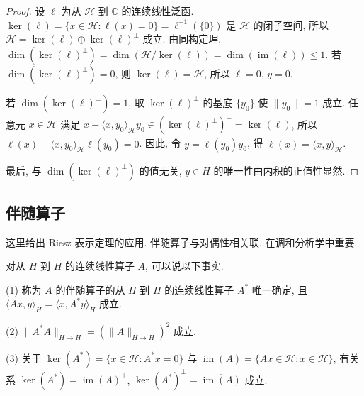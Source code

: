 \begin{proof}
设 $\ell$ 为从 $\mathcal{H}$ 到 $\mathbb{C}$ 的连续线性泛函. $\ker(\ell) = \{x \in \mathcal{H} : \ell(x) = 0\} = \ell^{-1}(\{0\})$ 是 $\mathcal{H}$ 的闭子空间, 所以 $\mathcal{H} = \ker(\ell) \oplus \ker(\ell)^{\perp}$ 成立. 由同构定理, $\dim(\ker(\ell)^{\perp}) = \dim(\mathcal{H}/\ker(\ell)) = \dim(\operatorname{im}(\ell)) \leq 1$. 若 $\dim(\ker(\ell)^{\perp}) = 0$, 则 $\ker(\ell) = \mathcal{H}$, 所以 $\ell = 0$, $y = 0$.

若 $\dim(\ker(\ell)^{\perp}) = 1$, 取 $\ker(\ell)^{\perp}$ 的基底 $\{y_{0}\}$ 使 $\|y_{0}\| = 1$ 成立. 任意元 $x \in \mathcal{H}$ 满足 $x - \langle x, y_{0} \rangle_{\mathcal{H}}y_{0} \in (\ker(\ell)^{\perp})^{\perp} = \ker(\ell)$, 所以 $\ell(x) - \langle x, y_{0} \rangle_{\mathcal{H}}\ell(y_{0}) = 0$. 因此, 令 $y = \overline{\ell(y_{0})}y_{0}$, 得 $\ell(x) = \langle x, y \rangle_{\mathcal{H}}$.

最后, 与 $\dim(\ker(\ell)^{\perp})$ 的值无关, $y \in H$ 的唯一性由内积的正值性显然.
\end{proof}

\subsection*{伴随算子}

这里给出 Riesz 表示定理的应用. 伴随算子与对偶性相关联, 在调和分析学中重要.

\begin{theorem}\label{thm:2.31}
对从 $H$ 到 $H$ 的连续线性算子 $A$, 可以说以下事实.

(1) 称为 $A$ 的伴随算子的从 $H$ 到 $H$ 的连续线性算子 $A^{*}$ 唯一确定, 且 $\langle Ax, y \rangle_{H} = \langle x, A^{*}y \rangle_{H}$ 成立.

(2) $\|A^{*}A\|_{H \to H} = (\|A\|_{H \to H})^{2}$ 成立.

(3) 关于 $\ker(A^{*}) = \{x \in \mathcal{H} : A^{*}x = 0\}$ 与 $\operatorname{im}(A) = \{Ax \in \mathcal{H} : x \in \mathcal{H}\}$, 有关系 $\ker(A^{*}) = \operatorname{im}(A)^{\perp}$, $\ker(A^{*})^{\perp} = \overline{\operatorname{im}(A)}$ 成立.
\end{theorem}

